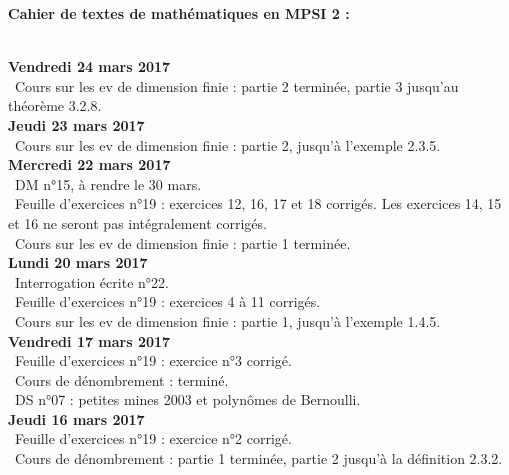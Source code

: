 \documentclass[12pt,a4paper]{article}
\begin{document}
\begin{center}
\Large\bf Cahier de textes de mathématiques en MPSI 2 :
\end{center}
\vspace{1cm}
\vspace{.4cm}\\

\noindent\textbf{Vendredi 24 mars 2017}\\
\bu\ Cours sur les ev de dimension finie : partie 2 terminée, partie 3 jusqu'au théorème 3.2.8.\vspace{.4cm}\\

\noindent\textbf{Jeudi 23 mars 2017}\\
\bu\ Cours sur les ev de dimension finie : partie 2, jusqu'à l'exemple 2.3.5.\vspace{.4cm}\\

\noindent\textbf{Mercredi 22 mars 2017}\\
\bu\ DM n°15, à rendre le 30 mars.\\
\bu\ Feuille d'exercices n°19 : exercices 12, 16, 17 et 18 corrigés. Les exercices 14, 15 et 16 ne seront pas intégralement corrigés. \\
\bu\ Cours sur les ev de dimension finie : partie 1 terminée.\vspace{.4cm}\\

\noindent\textbf{Lundi 20 mars 2017}\\
\bu\ Interrogation écrite n°22.\\
\bu\ Feuille d'exercices n°19 : exercices 4 à 11 corrigés.\\
\bu\ Cours sur les ev de dimension finie : partie 1, jusqu'à l'exemple 1.4.5.\vspace{.4cm}\\

\noindent\textbf{Vendredi 17  mars 2017}\\
\bu\ Feuille d'exercices n°19 : exercice n°3 corrigé.\\
\bu\ Cours de dénombrement : terminé.\\
\bu\ DS n°07 : petites mines 2003 et polynômes de Bernoulli.\vspace{.4cm}\\

\noindent\textbf{Jeudi 16  mars 2017}\\
\bu\ Feuille d'exercices n°19 : exercice n°2 corrigé.\\
\bu\ Cours de dénombrement : partie 1 terminée, partie 2 jusqu'à la définition 2.3.2.\vspace{.4cm}\\
\end{document}

